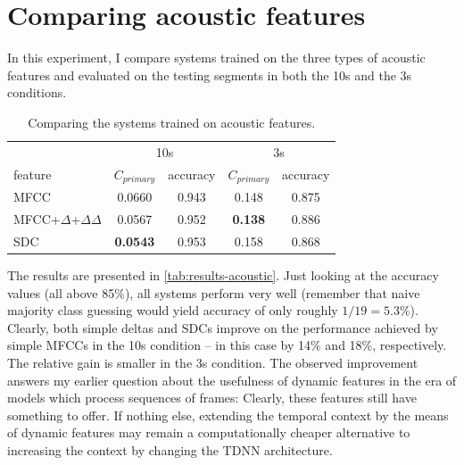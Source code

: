 \documentclass[bsc,frontabs,twoside,singlespacing,parskip,deptreport]{infthesis}
\begin{document}
{  \section{Comparing acoustic features}{
    \label{sec:exp-acoustic}

    In this experiment, I compare systems trained on the three types of acoustic features and evaluated on the testing segments in both the 10s and the 3s conditions.

    \begin{table}[h!tb]
      \centering
      \begin{sc}
        \footnotesize
        \begin{tabular}{l|cc|cc}
                  & \multicolumn{2}{c|}{10s}  & \multicolumn{2}{c}{3s} \\
          feature & $C_{primary}$ & accuracy & $C_{primary}$ & accuracy \\
          \hline
          MFCC & 0.0660 & 0.943 & 0.148 & 0.875 \\
          MFCC+$\Delta$+$\Delta\Delta$ & 0.0567 & 0.952 & \textbf{0.138} & 0.886 \\
          SDC & \textbf{0.0543} & 0.953 & 0.158 & 0.868 \\
        \end{tabular}
      \end{sc}
      \caption{Comparing the systems trained on acoustic features.}
      \label{tab:results-acoustic}
    \end{table}

    The results are presented in \autoref{tab:results-acoustic}. Just looking at the accuracy values (all above 85\%), all systems perform very well (remember that naive majority class guessing would yield accuracy of only roughly $1/19=5.3\%$).
    Clearly, both simple deltas and SDCs improve on the performance achieved by simple MFCCs in the 10s condition -- in this case by 14\% and 18\%, respectively. The relative gain is smaller in the 3s condition. 
    The observed improvement answers my earlier question about the usefulness of dynamic features in the era of models which process sequences of frames: Clearly, these features still have something to offer. If nothing else, extending the temporal context by the means of dynamic features may remain a computationally cheaper alternative to increasing the context by changing the TDNN architecture.

}}
\end{document}
